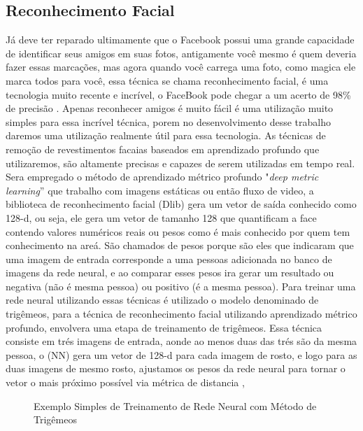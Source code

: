 \subsection{Reconhecimento Facial}
Já deve ter reparado ultimamente que o  Facebook possui uma grande capacidade de identificar seus amigos em suas fotos, antigamente você mesmo é quem deveria fazer essas marcações, mas agora quando você carrega uma foto, como magica ele marca todos para você, essa técnica se chama reconhecimento facial, é uma tecnologia muito recente e incrível, o FaceBook pode chegar a um acerto de 98\% de precisão \cite{adamgeitgey}.
Apenas reconhecer amigos é muito fácil é uma utilização muito simples para essa incrível técnica, porem no desenvolvimento desse trabalho daremos uma utilização realmente útil para essa tecnologia.
As técnicas de remoção de revestimentos facaias baseados em aprendizado profundo que utilizaremos, são altamente precisas e capazes de serem utilizadas em tempo real. Sera empregado o método de aprendizado métrico profundo "\textit{deep metric learning}” que trabalho com imagens estáticas ou então fluxo de video, a biblioteca de reconhecimento facial (Dlib) gera um vetor de saída conhecido como 128-d, ou seja, ele gera um vetor de tamanho 128 que quantificam a face contendo valores numéricos reais ou pesos como é mais conhecido por quem tem conhecimento na areá. São chamados de pesos porque são eles que indicaram que uma imagem de entrada corresponde a uma pessoas adicionada no banco de imagens da rede neural, e ao comparar esses pesos ira gerar um resultado ou negativa (não é mesma pessoa) ou positivo (é a mesma pessoa). Para treinar uma rede neural utilizando essas técnicas é utilizado o modelo denominado de trigêmeos, para a técnica de reconhecimento facial utilizando aprendizado métrico profundo, envolvera uma etapa de treinamento de trigêmeos. Essa técnica consiste em trés imagens de entrada, aonde ao menos duas das trés são da mesma pessoa, o (NN) gera um vetor de 128-d para cada imagem de rosto, e logo para as duas imagens de mesmo rosto, ajustamos os pesos da rede neural para tornar o vetor o mais próximo possível via métrica de distancia \cite{adriamRF},

\begin{figure}[H]
	\centering
	\caption{Exemplo Simples de Treinamento de Rede Neural com Método de Trigêmeos}
	\fontsize{9pt}{12pt}\selectfont
	\color{black}
	\def\svgwidth{15cm}
	
	\label{fig:treinsimp}
\end{figure}


